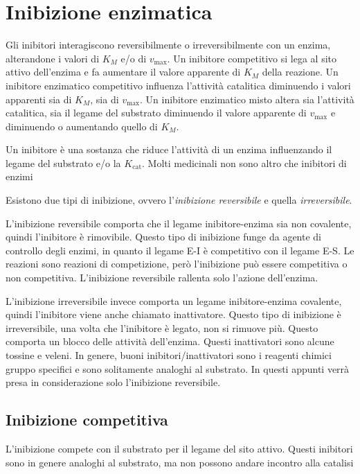 \clearpage

\section{Inibizione enzimatica}

Gli inibitori interagiscono reversibilmente o irreversibilmente con un enzima, alterandone i valori di $K_M$ e/o di $v_{\text{max}}$. Un inibitore competitivo si lega al sito attivo dell'enzima e fa aumentare il valore apparente di $K_M$ della reazione.
Un inibitore enzimatico competitivo influenza l'attività catalitica diminuendo i valori apparenti sia di $K_M$, sia di $v_{\text{max}}$. Un inibitore enzimatico misto altera sia l'attività catalitica, sia il legame del substrato diminuendo il valore apparente di $v_{\text{max}}$ e diminuendo o aumentando quello di $K_M$.

Un inibitore è una sostanza che riduce l'attività di un enzima influenzando il legame del substrato e/o la $K_{\text{cat}}$.
Molti medicinali non sono altro che inibitori di enzimi

Esistono due tipi di inibizione, ovvero l'\emph{inibizione reversibile} e quella \emph{irreversibile}.

L'inibizione reversibile comporta che il legame inibitore-enzima sia non covalente, quindi l'inibitore è rimovibile.
Questo tipo di inibizione funge da agente di controllo degli enzimi, in quanto il legame E-I è competitivo con il legame E-S. Le reazioni sono reazioni di competizione, però l'inibizione può essere competitiva o non competitiva. L'inibizione reversibile rallenta solo l'azione dell'enzima.

L'inibizione irreversibile invece comporta un legame inibitore-enzima covalente, quindi l'inibitore viene anche chiamato inattivatore. Questo tipo di inibizione è irreversibile, una volta che l'inibitore è legato, non si rimuove più. Questo comporta un blocco delle attività dell'enzima. Questi inattivatori sono alcune tossine e veleni.
In genere, buoni inibitori/inattivatori sono i reagenti chimici gruppo specifici e sono solitamente analoghi al substrato.
In questi appunti verrà presa in considerazione solo l'inibizione reversibile.

\subsection{Inibizione competitiva}

L'inibizione compete con il substrato per il legame del sito attivo. Questi inibitori sono in genere analoghi al substrato, ma non possono andare incontro alla catalisi

